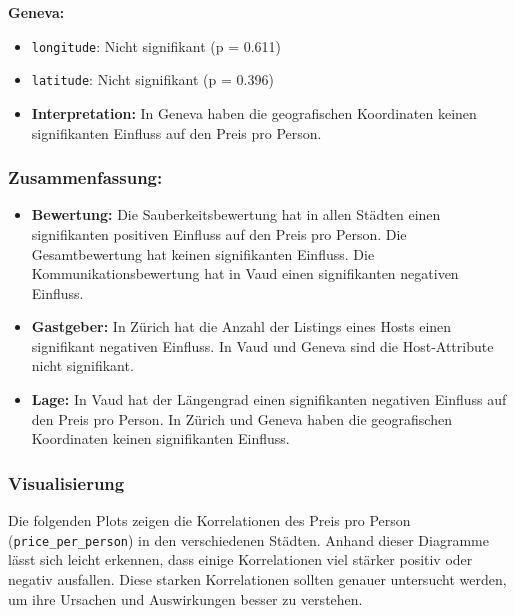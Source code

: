 \documentclass[
  journal,
]{IEEEtran}%
\providecommand{\tightlist}{%
  \setlength{\itemsep}{0pt}\setlength{\parskip}{0pt}}\usepackage{longtable,booktabs,array}
\begin{document}
\textbf{Geneva:}

\begin{itemize}
\item
  \texttt{longitude}: Nicht signifikant (p = 0.611)
\item
  \texttt{latitude}: Nicht signifikant (p = 0.396)
\item
  \textbf{Interpretation:} In Geneva haben die geografischen Koordinaten
  keinen signifikanten Einfluss auf den Preis pro Person.
\end{itemize}

\hypertarget{zusammenfassung}{%
\subsubsection{Zusammenfassung:}\label{zusammenfassung}}

\begin{itemize}
\tightlist
\item
  \textbf{Bewertung:} Die Sauberkeitsbewertung hat in allen Städten
  einen signifikanten positiven Einfluss auf den Preis pro Person. Die
  Gesamtbewertung hat keinen signifikanten Einfluss. Die
  Kommunikationsbewertung hat in Vaud einen signifikanten negativen
  Einfluss.
\item
  \textbf{Gastgeber:} In Zürich hat die Anzahl der Listings eines Hosts
  einen signifikant negativen Einfluss. In Vaud und Geneva sind die
  Host-Attribute nicht signifikant.
\item
  \textbf{Lage:} In Vaud hat der Längengrad einen signifikanten
  negativen Einfluss auf den Preis pro Person. In Zürich und Geneva
  haben die geografischen Koordinaten keinen signifikanten Einfluss.
\end{itemize}

\hypertarget{visualisierung-1}{%
\subsubsection{\texorpdfstring{\textbf{Visualisierung}}{Visualisierung}}\label{visualisierung-1}}

Die folgenden Plots zeigen die Korrelationen des Preis pro Person
(\texttt{price\_per\_person}) in den verschiedenen Städten. Anhand
dieser Diagramme lässt sich leicht erkennen, dass einige Korrelationen
viel stärker positiv oder negativ ausfallen. Diese starken Korrelationen
sollten genauer untersucht werden, um ihre Ursachen und Auswirkungen
besser zu verstehen.
\end{document}
